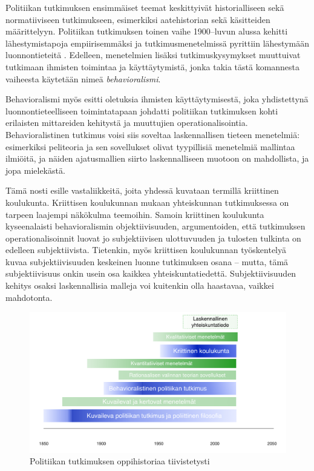 \documentclass[finnish,gradu,twoside,12pt]{tktltiki}
\begin{document}
Politiikan tutkimuksen ensimmäiset teemat keskittyivät historialliseen sekä normatiiviseen tutkimukseen, esimerkiksi aatehistorian sekä käsitteiden määrittelyyn. Politiikan tutkimuksen toinen vaihe 1900--luvun alussa kehitti lähestymistapoja empiirisemmäksi ja tutkimusmenetelmissä pyrittiin lähestymään luonnontieteitä \citep{historia}. Edelleen, menetelmien lisäksi tutkimuskysymykset muuttuivat tutkimaan ihmisten toimintaa ja käyttäytymistä, jonka takia tästä komannesta vaiheesta käytetään nimeä \textit{behavioralismi}.

Behavioralismi myös esitti oletuksia ihmisten käyttäytymisestä, joka yhdistettynä luonnontieteelliseen toimintatapaan johdatti politiikan tutkimuksen kohti erilaisten mittareiden kehitystä ja muuttujien operationalisointia. Behavioralistinen tutkimus voisi siis soveltaa laskennallisen tieteen menetelmiä: esimerkiksi peliteoria ja sen sovellukset olivat tyypillisiä menetelmiä mallintaa ilmiöitä, ja näiden ajatusmallien siirto laskennalliseen muotoon on mahdollista, ja jopa mielekästä.

Tämä nosti esille vastaliikkeitä, joita yhdessä kuvataan termillä kriittinen koulukunta. Kriittisen koulukunnan mukaan yhteiskunnan tutkimuksessa on tarpeen laajempi näkökulma teemoihin. Samoin kriittinen koulukunta kyseenalaisti behavioralismin objektiivisuuden, argumentoiden, että tutkimuksen operationalisoinnit luovat jo subjektiivisen ulottuvuuden ja tulosten tulkinta on edelleen subjektiivista. Tietenkin, myös kriittisen koulukunnan työskentelyä kuvaa subjektiivisuuden keskeinen luonne tutkimuksen osana -- mutta, tämä subjektiivisuus onkin usein osa kaikkea yhteiskuntatiedettä. Subjektiivisuuden kehitys osaksi laskennallisia malleja voi kuitenkin olla haastavaa, vaikkei mahdotonta.

\begin{figure}
\includegraphics[width=12cm]{images/historia.pdf} 
\caption{Politiikan tutkimuksen oppihistoriaa tiivistetysti}
\label{fig:historia}
\end{figure}
\end{document}
